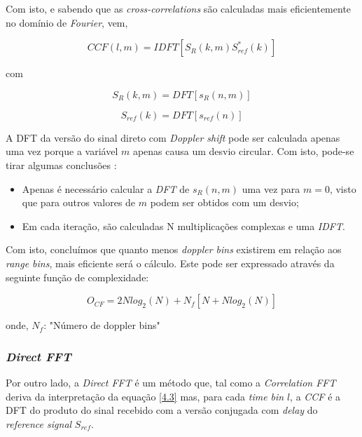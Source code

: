 Com isto, e sabendo que as \textit{cross-correlations} são calculadas mais eficientemente no domínio de \textit{Fourier}, vem,

\begin{equation} \label{4.7}
CCF\left(l,m\right) = IDFT\left[ S_{R}\left( k,m\right)S_{ref}^{\ast}\left(k\right)\right] 
\end{equation}

com 

\begin{equation} \label{4.8}
S_{R}\left( k,m\right)  = DFT\left[ s_{R}\left( n,m\right) \right] 
\end{equation}

\begin{equation} \label{4.9}
S_{ref}\left( k\right)  = DFT\left[ s_{ref}\left( n\right) \right] 
\end{equation}

A \gls{DFT} da versão do sinal direto com \textit{Doppler shift} pode ser calculada apenas uma vez porque a variável $m$ apenas causa um desvio circular.
Com isto, pode-se tirar algumas conclusões \parencite{Martorella}:
\begin{itemize}
\item Apenas é necessário calcular a \textit{\gls{DFT}} de $s_{R}\left( n,m\right)$ uma vez para $m=0$, visto que para outros valores de $m$ podem ser obtidos com um desvio;
\item Em cada iteração, são calculadas N multiplicações complexas e uma \textit{\gls{IDFT}}.
\end{itemize}

Com isto, concluímos que quanto menos \textit{doppler bins} existirem em relação aos \textit{range bins}, mais eficiente será o cálculo. Este pode ser expressado através da seguinte função de complexidade:

\begin{equation} \label{4.10}
O_{CF}=2Nlog_{2}(N)+N_{f}[N+Nlog_{2}(N)]
\end{equation}

onde,
$N_{f}$: "Número de doppler bins"

\subsubsection*{\textit{Direct FFT}}
Por outro lado, a \textit{Direct FFT} é um método que, tal como a \textit{Correlation FFT} deriva da interpretação da equação \ref{4.3} mas, para cada \textit{time bin} $l$, a \textit{\gls{CCF}} é a \gls{DFT} do produto do sinal recebido com a versão conjugada com \textit{delay} do \textit{reference signal} $S_{ref}$.

